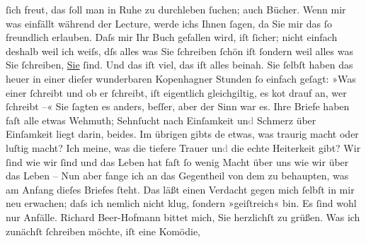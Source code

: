 \begin{ledgroupsized}[t]{13cm}
               ſich freut, das ſoll man in Ruhe zu durchleben ſuchen; auch Bücher. Wenn mir was
               einfällt während der Lecture, werde ichs Ihnen ſagen, da Sie mir das ſo freundlich
               erlauben. Daſs {\pb}mir Ihr Buch gefallen wird, iſt
               ſicher; nicht einfach deshalb weil ich weiſs, dſs alles was Sie ſchreiben ſchön iſt
               ſondern weil alles was Sie ſchreiben, \uline{Sie}{ }ſind. Und das iſt viel, das iſt alles beinah. Sie
               ſelbſt haben das heuer in einer dieſer wunderbaren Kopenhagner Stunden ſo einfach geſagt: »Was einer ſchreibt und ob er
               ſchreibt, iſt eigentlich gleichgiltig, es ko{\geminationm}t drauf an,
               wer ſchreibt –« Sie ſagten es anders, beſſer, aber der Sinn {\pb}war es.\pend
           \pstart
           Ihre Briefe haben faſt alle etwas Wehmuth; Sehnſucht nach Einſamkeit
                  un\textcolor{gray}{d}{ }Schmerz über Einſamkeit liegt darin, beides. Im
               übrigen gibts de{\geminationn} etwas, was traurig macht oder luſtig
               macht? Ich meine, was die tiefere Trauer un\textcolor{gray}{d} die echte Heiterkeit
               gibt? Wir ſind wie wir ſind und das Leben hat faſt ſo wenig Macht über uns wie wir
               über das Leben – Nun aber fange ich an das Gegentheil von dem zu behaupten, {\pb}was am Anfang dieſes Briefes ſteht. Das läßt einen
               Verdacht gegen mich ſelbſt in mir neu erwachen; daſs ich nemlich nicht klug, ſondern
               »geiſtreich« bin. Es ſind wohl nur Anfälle.\pend
           \pstart
           Richard Beer-Hofmann bittet mich, Sie
               herzlichſt zu grüßen.\pend
           \pstart
           Was ich zunächſt ſchreiben möchte, iſt eine Komödie, \label{K_L00643-1v}
\end{ledgroupsized}
